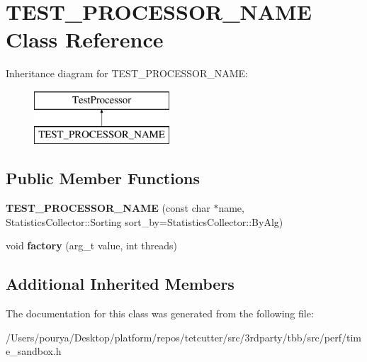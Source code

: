 \hypertarget{classTEST__PROCESSOR__NAME}{}\section{T\+E\+S\+T\+\_\+\+P\+R\+O\+C\+E\+S\+S\+O\+R\+\_\+\+N\+A\+M\+E Class Reference}
\label{classTEST__PROCESSOR__NAME}
Inheritance diagram for T\+E\+S\+T\+\_\+\+P\+R\+O\+C\+E\+S\+S\+O\+R\+\_\+\+N\+A\+M\+E\+:\begin{figure}[H]
\begin{center}
\leavevmode
\includegraphics[height=2.000000cm]{classTEST__PROCESSOR__NAME}
\end{center}
\end{figure}
\subsection*{Public Member Functions}
\begin{DoxyCompactItemize}
\item 
\hypertarget{classTEST__PROCESSOR__NAME_a809f58c53b55a496c6460cc264b6c14c}{}{\bfseries T\+E\+S\+T\+\_\+\+P\+R\+O\+C\+E\+S\+S\+O\+R\+\_\+\+N\+A\+M\+E} (const char $\ast$name, Statistics\+Collector\+::\+Sorting sort\+\_\+by=Statistics\+Collector\+::\+By\+Alg)\label{classTEST__PROCESSOR__NAME_a809f58c53b55a496c6460cc264b6c14c}

\item 
\hypertarget{classTEST__PROCESSOR__NAME_a372acc27b9e7e3e56b8c26bb490e4f23}{}void {\bfseries factory} (arg\+\_\+t value, int threads)\label{classTEST__PROCESSOR__NAME_a372acc27b9e7e3e56b8c26bb490e4f23}

\end{DoxyCompactItemize}
\subsection*{Additional Inherited Members}


The documentation for this class was generated from the following file\+:\begin{DoxyCompactItemize}
\item 
/\+Users/pourya/\+Desktop/platform/repos/tetcutter/src/3rdparty/tbb/src/perf/time\+\_\+sandbox.\+h\end{DoxyCompactItemize}
